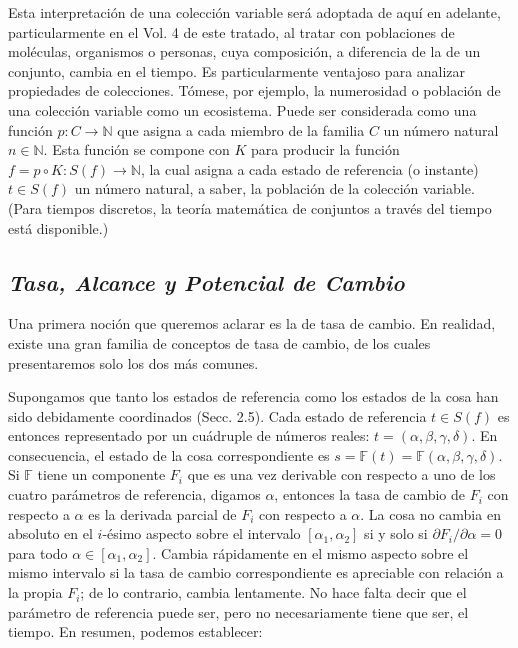 \begin{justifying}
    \newpage

    Esta interpretación de una colección variable será adoptada de aquí en adelante, particularmente en el Vol. 4 de 
    este tratado, al tratar con poblaciones de moléculas, organismos o personas, cuya composición, a diferencia de la 
    de un conjunto, cambia en el tiempo. Es particularmente ventajoso para analizar propiedades de colecciones. Tómese, 
    por ejemplo, la numerosidad o población de una colección variable como un ecosistema. Puede ser considerada como una
    función $p: C \to \mathbb{N}$ que asigna a cada miembro de la familia $C$ un número natural $n \in \mathbb{N}$. Esta 
    función se compone con $K$ para producir la función $f = p \circ K: S(f) \to \mathbb{N}$, la cual asigna a cada estado 
    de referencia (o instante) $t \in S(f)$ un número natural, a saber, la población de la colección variable. (Para tiempos 
    discretos, la teoría matemática de conjuntos a través del tiempo está disponible.)

    \subsection{\textit {Tasa, Alcance y Potencial de Cambio}}

    \noindent Una primera noción que queremos aclarar es la de tasa de cambio. En realidad, existe una gran familia de conceptos 
    de tasa de cambio, de los cuales presentaremos solo los dos más comunes.

    Supongamos que tanto los estados de referencia como los estados de la cosa han sido debidamente coordinados (Secc. 2.5). Cada 
    estado de referencia $t \in S(f)$ es entonces representado por un cuádruple de números reales: $t = (\alpha, \beta, \gamma, \delta)$. 
    En consecuencia, el estado de la cosa correspondiente es $s = \mathbb{F}(t) = \mathbb{F}(\alpha, \beta, \gamma, \delta)$. Si $\mathbb{F}$ 
    tiene un componente $F_i$ que es una vez derivable con respecto a uno de los cuatro parámetros de referencia, digamos $\alpha$, entonces 
    la tasa de cambio de $F_i$ con respecto a $\alpha$ es la derivada parcial de $F_i$ con respecto a $\alpha$. La cosa no cambia en absoluto 
    en el $i$-ésimo aspecto sobre el intervalo $[\alpha_1, \alpha_2]$ si y solo si $\partial F_i/\partial \alpha = 0$ para todo $\alpha \in [\alpha_1, \alpha_2]$. 
    Cambia rápidamente en el mismo aspecto sobre el mismo intervalo si la tasa de cambio correspondiente es apreciable con relación a la 
    propia $F_i$; de lo contrario, cambia lentamente. No hace falta decir que el parámetro de referencia puede ser, pero no necesariamente 
    tiene que ser, el tiempo. En resumen, podemos establecer:


\end{justifying}
